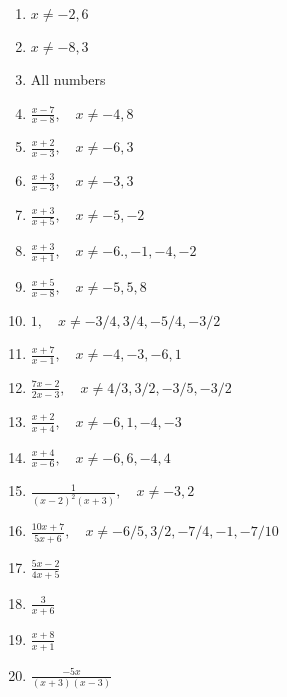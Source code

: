 \documentclass[a4paper]{JAC2003}
\begin{document}
\begin{enumerate}
\item $x \neq-2,6$

\item $x \neq-8,3$

\item All numbers

\item $\frac{x-7}{x-8}, \quad x \neq-4,8$ %

\item $\frac{x+2}{x-3}, \quad x \neq-6,3$

\item $\frac{x+3}{x-3}, \quad x \neq-3,3$

\item $\frac{x+3}{x+5}, \quad x \neq-5,-2$

\item $\frac{x+3}{x+1}, \quad x \neq-6 .,-1,-4,-2$

\item $\frac{x+5}{x-8}, \quad x \neq-5,5,8$

\item $1, \quad x \neq-3 / 4,3 / 4,-5 / 4,-3 / 2$

\item $\frac{x+7}{x-1}, \quad x \neq-4,-3,-6,1$

\item $\frac{7 x-2}{2 x-3}, \quad x \neq 4 / 3,3 / 2,-3 / 5,-3 / 2$

\item $\frac{x+2}{x+4}, \quad x \neq-6,1,-4,-3$

\item $\frac{x+4}{x-6}, \quad x \neq-6,6,-4,4$

\item $\frac{1}{(x-2)^{2}(x+3)}, \quad x \neq-3,2$

\item $\frac{10 x+7}{5 x+6}, \quad x \neq-6 / 5,3 / 2,-7 / 4,-1,-7 / 10$ %

\item $\frac{5 x-2}{4 x+5}$ %

\item $\frac{3}{x+6}$ %

\item $\frac{x+8}{x+1}$

\item $\frac{-5 x}{(x+3)(x-3)}$ %


\end{enumerate}
\end{document}
